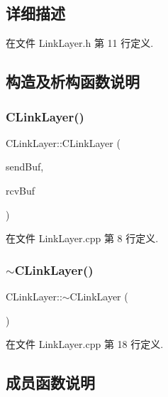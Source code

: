 \subsection{详细描述}


在文件 Link\+Layer.\+h 第 11 行定义.



\subsection{构造及析构函数说明}
\mbox{\label{class_c_link_layer_a74cefcec9517de56f587fb26d646d610}} 
\subsubsection{\texorpdfstring{C\+Link\+Layer()}{CLinkLayer()}}
{\footnotesize\ttfamily C\+Link\+Layer\+::\+C\+Link\+Layer (\begin{DoxyParamCaption}\item[{\hyperlink{class_msg_list}{Msg\+List} \&}]{send\+Buf,  }\item[{\hyperlink{class_msg_list}{Msg\+List} \&}]{rcv\+Buf }\end{DoxyParamCaption})}



在文件 Link\+Layer.\+cpp 第 8 行定义.

\mbox{\label{class_c_link_layer_a47070db4af2382a2241455a62c93c4a5}} 
\subsubsection{\texorpdfstring{$\sim$\+C\+Link\+Layer()}{~CLinkLayer()}}
{\footnotesize\ttfamily C\+Link\+Layer\+::$\sim$\+C\+Link\+Layer (\begin{DoxyParamCaption}{ }\end{DoxyParamCaption})}



在文件 Link\+Layer.\+cpp 第 18 行定义.



\subsection{成员函数说明}
\mbox{\label{class_c_link_layer_a6ef143071b324acea3cd11ef86ba850f}} 
